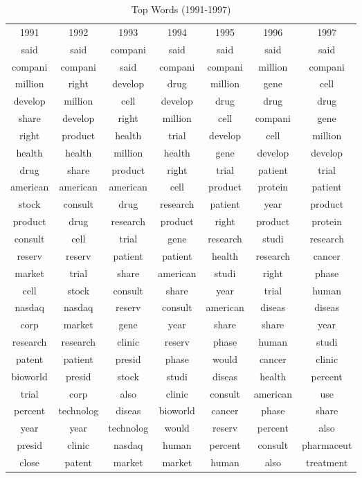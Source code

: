 \begin{table}
\footnotesize
\begin{center}
\caption[Top Words (1991-1997)]{Top Words (1991-1997) \label{topwords1}}
\vspace{0.3in}
\begin{tabular}{ccccccc}
\hline 
\hline
1991 & 1992 & 1993 & 1994 & 1995 & 1996 & 1997 \\
said & said & compani & said & said & said & said \\
compani & compani & said & compani & compani & million & compani \\
million & right & develop & drug & million & gene & cell \\
develop & million & cell & develop & drug & drug & drug \\
share & develop & right & million & cell & compani & gene \\
right & product & health & trial & develop & cell & million \\
health & health & million & health & gene & develop & develop \\
drug & share & product & right & trial & patient & trial \\
american & american & american & cell & product & protein & patient \\
stock & consult & drug & research & patient & year & product \\
product & drug & research & product & right & product & protein \\
consult & cell & trial & gene & research & studi & research \\
reserv & reserv & patient & patient & health & research & cancer \\
market & trial & share & american & studi & right & phase \\
cell & stock & consult & share & year & trial & human \\
nasdaq & nasdaq & reserv & consult & american & diseas & diseas \\
corp & market & gene & year & share & share & year \\
research & research & clinic & reserv & phase & human & studi \\
patent & patient & presid & phase & would & cancer & clinic \\
bioworld & presid & stock & studi & diseas & health & percent \\
trial & corp & also & clinic & consult & american & use \\
percent & technolog & diseas & bioworld & cancer & phase & share \\
year & year & technolog & would & reserv & percent & also \\
presid & clinic & nasdaq & human & percent & consult & pharmaceut \\
close & patent & market & market & human & also & treatment \\
\hline
\end{tabular}
\end{center}
\end{table}
